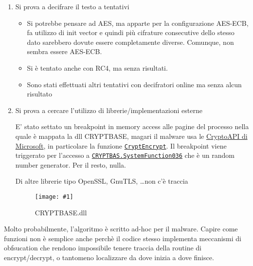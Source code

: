 \documentclass[
    a4paper, %
    11pt %
]{article}
\newcommand{\pic}[4]{\begin{figure}[H]
            \centering
            \texttt{[image: \#1]}
            \caption{#2}
            \label{fig:#1}
            \end{figure}}
\begin{document}
            \begin{enumerate}
                \item Si prova a decifrare il testo a tentativi
                    \begin{itemize}
                        \item Si potrebbe pensare ad AES, ma apparte per la configurazione AES-ECB, fa utilizzo di 
                            init
                            vector e quindi più cifrature consecutive dello stesso dato sarebbero dovute essere completamente diverse. Comunque, non sembra essere AES-ECB.

                        \item Si è tentato anche con RC4, ma senza risultati.

                        \item Sono stati effettuati altri tentativi con decifratori online ma senza alcun risultato
                    \end{itemize}

                \item Si prova a cercare l'utilizzo di librerie/implementazioni esterne
                
                    E' stato settato un breakpoint in memory access alle pagine del processo nella quale è
                    mappata la dll CRYPTBASE, magari il malware usa le 
                    \href{https://learn.microsoft.com/it-it/windows/win32/seccrypto/cryptoapi-system-architecture}
                    {CryptoAPI di Microsoft}, in particolare la funzione \href{https://learn.microsoft.com/it-it/
                    windows/win32/api/wincrypt/nf-wincrypt-cryptencrypt}{\texttt{CryptEncrypt}}. Il breakpoint
                    viene triggerato per l'accesso a \href{https://learn.microsoft.com/it-it/windows/win32/api/ntsecapi/nf-ntsecapi-rtlgenrandom}{\texttt{CRYPTBAS.SystemFunction036}} che è un random number
                    generator. Per il resto, nulla.

                    Di altre librerie tipo OpenSSL, GnuTLS, \dots non c'è traccia
                    \pic{cryptlib}{CRYPTBASE.dll}{10cm}{4cm}
            \end{enumerate}

            Molto probabilmente, l'algoritmo è scritto ad-hoc per il malware. Capire come funzioni non è semplice
            anche perchè il codice stesso implementa meccanismi di obfsucation che rendono impossibile tenere traccia della routine di encrypt/decrypt, o tantomeno localizzare da dove inizia a dove finisce.
\end{document}
